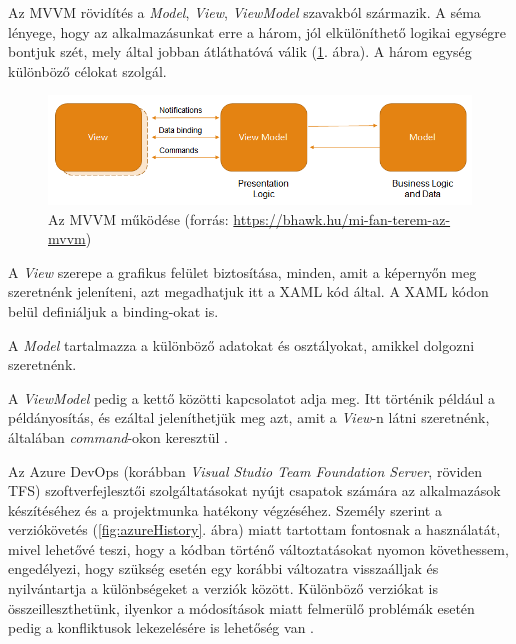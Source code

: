 
Az MVVM rövidítés a \textit{Model}, \textit{View}, \textit{ViewModel} szavakból származik. A séma lényege, hogy az alkalmazásunkat erre a három, jól elkülöníthető logikai egységre bontjuk szét, mely által jobban átláthatóvá válik (\ref{fig:mvvm}. ábra). A három egység különböző célokat szolgál.

\begin{figure}[h]
	\centering
	\includegraphics[scale=0.5]{images/mvvm.png}
	\caption{Az MVVM működése (forrás: \url{https://bhawk.hu/mi-fan-terem-az-mvvm})}
	\label{fig:mvvm}
\end{figure}

A \textit{View} szerepe a grafikus felület biztosítása, minden, amit a képernyőn meg szeretnénk jeleníteni, azt megadhatjuk itt a XAML kód által. A XAML kódon belül definiáljuk a binding-okat is.

A \textit{Model} tartalmazza a különböző adatokat és osztályokat, amikkel dolgozni szeretnénk.

A \textit{ViewModel} pedig a kettő közötti kapcsolatot adja meg. Itt történik például a példányosítás, és ezáltal jeleníthetjük meg azt, amit a \textit{View}-n látni szeretnénk, általában \textit{command}-okon keresztül \cite{mvvm}.


Az Azure DevOps (korábban \textit{Visual Studio Team Foundation Server}, röviden TFS) szoftverfejlesztői szolgáltatásokat nyújt csapatok számára az alkalmazások készítéséhez és a projektmunka hatékony végzéséhez. Személy szerint a verziókövetés (\ref{fig:azureHistory}. ábra) miatt tartottam fontosnak a használatát, mivel lehetővé teszi, hogy a kódban történő változtatásokat nyomon követhessem, engedélyezi, hogy szükség esetén egy korábbi változatra visszaálljak és nyilvántartja a különbségeket a verziók között. Különböző verziókat is összeilleszthetünk, ilyenkor a módosítások miatt felmerülő problémák esetén pedig a konfliktusok lekezelésére is lehetőség van \cite{azure}.

